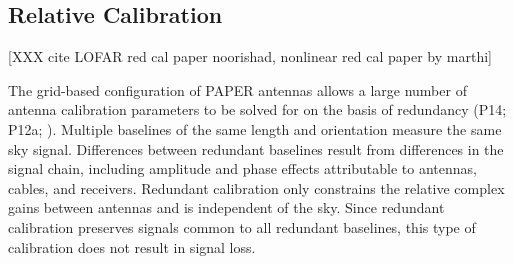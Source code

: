 \documentclass[twocolumn,numberedappendix]{emulateapj} \shorttitle{New Limits on the 21 cm Power Spectrum at $z=8.4$}
\begin{document}
\subsection{Relative Calibration}\label{sec:relcal}
[XXX cite LOFAR red cal paper noorishad, nonlinear red cal paper by marthi]
%         
%

The grid-based configuration of PAPER antennas allows a large number of antenna
calibration parameters to be solved for on the basis of redundancy (P14; P12a;
\citealt{zheng_et_al2014}).  Multiple baselines of the same length and
orientation measure the same sky signal. Differences between redundant
baselines result from differences in the signal chain, including amplitude and
phase effects attributable to antennas, cables, and receivers.  Redundant
calibration only constrains the relative complex gains between antennas and is
independent of the sky. Since redundant calibration preserves signals common to
all redundant baselines, this type of calibration does not result in signal loss.
\end{document}

